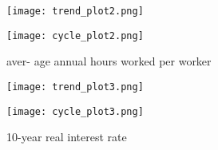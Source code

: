 \documentclass[a4paper]{article}
\begin{document}
\begin{figure}[htbp]
  \begin{minipage}[b]{0.49\linewidth}
    \centering
    \texttt{[image: trend\_plot2.png]}
  \end{minipage}
  \begin{minipage}[b]{0.49\linewidth}
    \centering
    \texttt{[image: cycle\_plot2.png]}
  \end{minipage}
  \caption{aver-
age annual hours worked per worker}
\end{figure}


\begin{figure}[htbp]
  \begin{minipage}[b]{0.49\linewidth}
    \centering
    \texttt{[image: trend\_plot3.png]}
  \end{minipage}
  \begin{minipage}[b]{0.49\linewidth}
    \centering
    \texttt{[image: cycle\_plot3.png]}
  \end{minipage}
  \caption{10-year real interest rate}
\end{figure}

\section{} %
\end{document}

